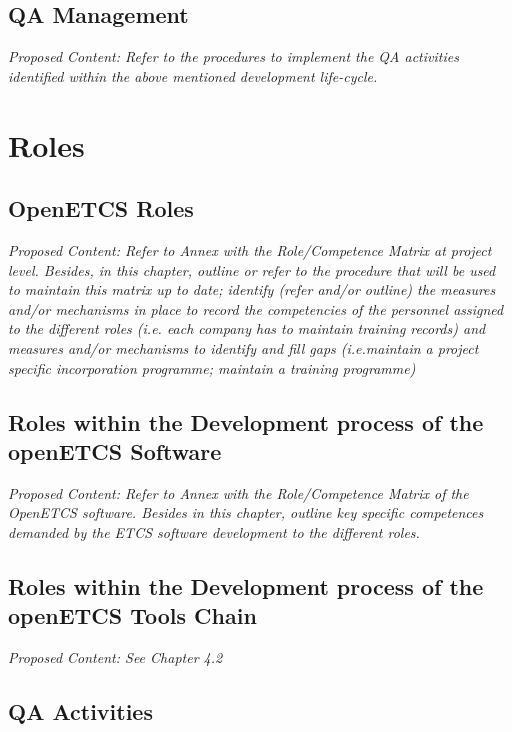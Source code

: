 \documentclass{template/openetcs_article}
\begin{document}
\subsection{QA Management }
\textit{Proposed Content: Refer to the procedures to implement the QA activities identified within the above mentioned development life-cycle. }

\section{Roles}
\subsection{OpenETCS Roles}


\textit{Proposed Content: Refer to Annex with the Role/Competence Matrix at project level.
Besides, in this chapter,  outline or refer to the procedure that will be used to maintain this matrix up to date; identify (refer and/or outline) the measures and/or mechanisms in place to record the competencies of the personnel assigned to the different roles (i.e. each company has to maintain training records) and measures and/or mechanisms to identify and fill gaps (i.e.maintain a project specific incorporation programme; maintain a training programme)}

\subsection{Roles within the Development process of the openETCS Software}
\textit{Proposed Content: Refer to Annex with the Role/Competence Matrix of the OpenETCS software. 
Besides in this chapter, outline key specific competences demanded by the ETCS software development to the different roles.}

\subsection{Roles within the Development process of the openETCS Tools Chain}
\textit{Proposed Content: See Chapter 4.2}

\subsection{QA Activities}
\end{document}
